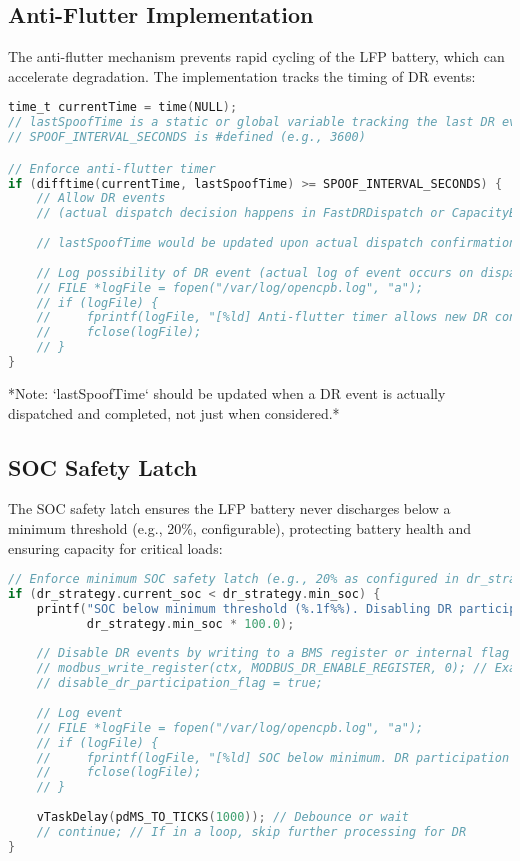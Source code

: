 \documentclass[11pt,a4paper]{article}
\begin{document}
\subsection{Anti-Flutter Implementation}
The anti-flutter mechanism prevents rapid cycling of the LFP battery, which can accelerate degradation. The implementation tracks the timing of DR events:

\begin{lstlisting}[language=C, caption=Anti-Flutter Timer Implementation (Conceptual Snippet from `SpoofSOC` Task), label=lst:anti-flutter]
time_t currentTime = time(NULL);
// lastSpoofTime is a static or global variable tracking the last DR event dispatch
// SPOOF_INTERVAL_SECONDS is #defined (e.g., 3600)

// Enforce anti-flutter timer
if (difftime(currentTime, lastSpoofTime) >= SPOOF_INTERVAL_SECONDS) {
    // Allow DR events 
    // (actual dispatch decision happens in FastDRDispatch or CapacityBidding)
    
    // lastSpoofTime would be updated upon actual dispatch confirmation
    
    // Log possibility of DR event (actual log of event occurs on dispatch)
    // FILE *logFile = fopen("/var/log/opencpb.log", "a");
    // if (logFile) {
    //     fprintf(logFile, "[%ld] Anti-flutter timer allows new DR consideration.\n", currentTime);
    //     fclose(logFile);
    // }
}
\end{lstlisting}
*Note: `lastSpoofTime` should be updated when a DR event is actually dispatched and completed, not just when considered.*

\subsection{SOC Safety Latch}
The SOC safety latch ensures the LFP battery never discharges below a minimum threshold (e.g., 20\%, configurable), protecting battery health and ensuring capacity for critical loads:

\begin{lstlisting}[language=C, caption=SOC Safety Latch Implementation (Snippet from `SpoofSOC` Task), label=lst:soc-safety]
// Enforce minimum SOC safety latch (e.g., 20% as configured in dr_strategy.min_soc)
if (dr_strategy.current_soc < dr_strategy.min_soc) {
    printf("SOC below minimum threshold (%.1f%%). Disabling DR participation.\n", 
           dr_strategy.min_soc * 100.0);
           
    // Disable DR events by writing to a BMS register or internal flag
    // modbus_write_register(ctx, MODBUS_DR_ENABLE_REGISTER, 0); // Example
    // disable_dr_participation_flag = true;
    
    // Log event
    // FILE *logFile = fopen("/var/log/opencpb.log", "a");
    // if (logFile) {
    //     fprintf(logFile, "[%ld] SOC below minimum. DR participation disabled.\n", currentTime);
    //     fclose(logFile);
    // }
    
    vTaskDelay(pdMS_TO_TICKS(1000)); // Debounce or wait
    // continue; // If in a loop, skip further processing for DR
}
\end{lstlisting}
\end{document}
